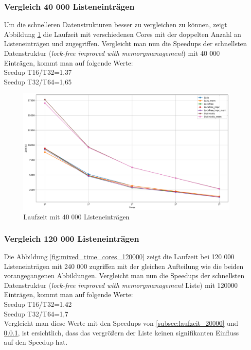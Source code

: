  \subsubsection{Vergleich 40 000 Listeneinträgen}
 \label{subsub:Vergleich_40000}
 Um die schnelleren Datenstrukturen besser zu vergleichen zu können, zeigt Abbildung \ref{fig:mixed_time_cores_40000} die Laufzeit mit verschiedenen Cores
mit der doppelten Anzahl an Listeneinträgen und zugegriffen. 
Vergleicht man nun die Speedups der schnellsten Datenstruktur (\textit{lock-free improved with memorymanagement})
mit 40 000 Einträgen, kommt man auf folgende Werte:
\\Seedup T16/T32=1,37
\\Seedup T32/T64=1,65


\begin{figure}[H]
	\centering
	\includegraphics[width=1.0\linewidth]{./plots_pdf/mixed_time_cores_40000.pdf} 
	\caption{Laufzeit mit 40 000 Listeneinträgen}
	\label{fig:mixed_time_cores_40000} 
\end{figure}

\subsubsection{Vergleich 120 000 Listeneinträgen}
Die Abbildung \ref{fig:mixed_time_cores_120000} zeigt die Laufzeit bei
120 000 Listeneinträgen mit 240 000 zugriffen mit der gleichen Aufteilung wie die beiden vorangegangenen Abbildungen.
Vergleicht man nun die Speedups der schnellsten Datenstruktur (\textit{lock-free improved with memorymanagement} Liste)
mit 120000 Einträgen, kommt man auf folgende Werte:
\\Seedup T16/T32=1.42
\\Seedup T32/T64=1,7
\\ Vergleicht man diese Werte mit den Speedups von \ref{subsec:laufzeit_20000} und \ref{subsub:Vergleich_40000}, 
ist ersichtlich, dass das vergrößern der Liste keinen signifikanten Einfluss auf den Speedup hat. 



